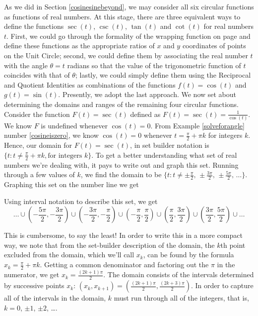 \medskip

As we did in Section \ref{cosinesinebeyond}, we may consider all six circular functions as functions of real numbers. At this stage, there are three equivalent ways to define the functions $\sec(t)$, $\csc(t)$, $\tan(t)$ and $\cot(t)$ for real numbers $t$.  First, we could go through the formality of the wrapping function on page \pageref{wrappingfunction} and define these functions as the appropriate ratios of  $x$ and $y$ coordinates of points on the Unit Circle;  second, we could define them by associating the real number $t$ with the angle $\theta = t$ radians so that the value of the trigonometric function of $t$ coincides with that of  $\theta$;  lastly, we could simply define them using the Reciprocal and Quotient Identities as combinations of the functions $f(t) = \cos(t)$ and $g(t) = \sin(t)$.  Presently, we adopt the last approach.  We now set about determining the domains and ranges of the remaining four circular functions.  Consider the function $F(t) = \sec(t)$ defined as $F(t) = \sec(t) = \frac{1}{\cos(t)}$.  We know $F$ is undefined whenever $\cos(t) = 0$.  From Example \ref{solveforangle} number \ref{cosineiszero}, we know $\cos(t) = 0$ whenever $t = \frac{\pi}{2} + \pi k$ for integers $k$.  Hence, our domain for $F(t) = \sec(t)$, in set builder notation is  $\{ t : t \neq  \frac{\pi}{2} + \pi k, \text{for integers $k$} \}$.  To get a better understanding what set of real numbers we're dealing with, it pays to write out and graph this set.  Running through a few values of $k$, we find the domain to be  $\{ t : t \neq  \pm \frac{\pi}{2}, \, \pm \frac{3\pi}{2}, \, \pm \frac{5\pi}{2}, \, \ldots \}$.  Graphing this set on the number line we get


\begin{center}
\end{center}

Using interval notation to describe this set, we get  \[ \ldots \cup \left( -\frac{5\pi}{2}, -\frac{3\pi}{2}\right) \cup \left( -\frac{3\pi}{2}, -\frac{\pi}{2}\right) \cup  \left(-\frac{\pi}{2}, \frac{\pi}{2}\right) \cup \left(\frac{\pi}{2}, \frac{3\pi}{2}\right) \cup  \left(\frac{3\pi}{2}, \frac{5\pi}{2}\right) \cup \ldots \]

This is cumbersome, to say the least!  In order to write this in a more compact way, we note that from the set-builder description of the domain, the $k$th point excluded from the domain, which we'll call $x_{k}$, can be found by the formula $x_k =  \frac{\pi}{2} + \pi k$.    Getting a common denominator and factoring out the $\pi$ in the numerator, we get  $x_{k} = \frac{(2k+1)\pi}{2}$.  The domain consists of the intervals determined by successive points $x_{k}$:   $\left(x_{k}, x_{k+1}\right) = \left( \frac{(2k+1)\pi}{2},  \frac{(2k+3)\pi}{2}\right)$.  In order to capture all of the intervals in the domain, $k$ must run through all of the integers, that is, $k = 0$, $\pm 1$, $\pm 2$, \ldots.  
\pagebreak


